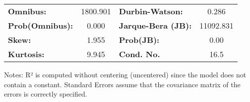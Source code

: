 \begin{center}
\begin{tabular}{lcccccc}
\bottomrule
\end{tabular}
\begin{tabular}{lclc}
\textbf{Omnibus:}       & 1800.901 & \textbf{  Durbin-Watson:     } &     0.286  \\
\textbf{Prob(Omnibus):} &   0.000  & \textbf{  Jarque-Bera (JB):  } & 11092.831  \\
\textbf{Skew:}          &   1.955  & \textbf{  Prob(JB):          } &      0.00  \\
\textbf{Kurtosis:}      &   9.945  & \textbf{  Cond. No.          } &      16.5  \\
\bottomrule
\end{tabular}
\end{center}

Notes: \newline
 [1] R² is computed without centering (uncentered) since the model does not contain a constant. \newline
 [2] Standard Errors assume that the covariance matrix of the errors is correctly specified.